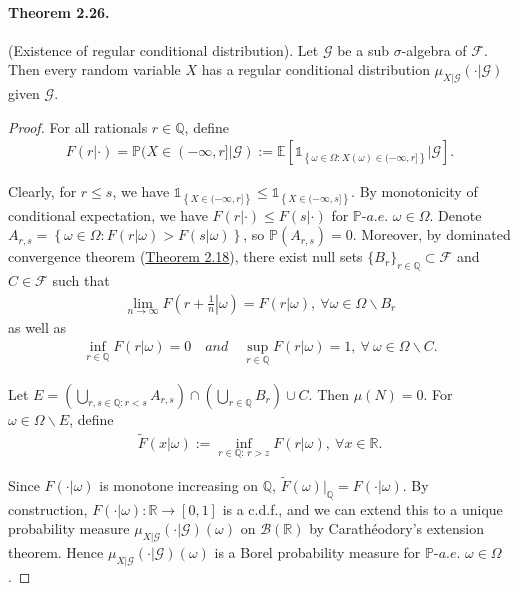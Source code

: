\documentclass{article}
\numberwithin{equation}{section}
\newcommand{\E}{\mathbb{E}}
\renewcommand{\P}{\mathbb{P}}
\theoremstyle{plain}
\theoremstyle{definition}
\begin{document}
\paragraph{Theorem 2.26.\label{thm:2.26}} (Existence of regular conditional distribution). Let $\mathscr{G}$ be a sub $\sigma$-algebra of $\mathscr{F}$. Then every random variable $X$ has a regular conditional distribution $\mu_{X|\mathscr{G}}(\cdot|\mathscr{G})$ given $\mathscr{G}$.
\begin{proof}
For all rationals $r\in\mathbb{Q}$, define
\begin{align*}
	F(r|\cdot) = \P(X\in(-\infty,r]|\mathscr{G}):=\E[\mathds{1}_{\left\{\omega\in\Omega:X(\omega)\in(-\infty,r]\right\}}|\mathscr{G}].
\end{align*}

Clearly, for $r\leq s$, we have $\mathds{1}_{\left\{X\in(-\infty,r]\right\}}\leq\mathds{1}_{\left\{X\in(-\infty,s]\right\}}$. By monotonicity of conditional expectation, we have $F(r|\cdot)\leq F(s|\cdot)$ for $\P\textit{-a.e.}$ $\omega\in\Omega$. Denote $A_{r,s}=\left\{\omega\in\Omega:F(r|\omega)> F(s|\omega)\right\}$, so $\P(A_{r,s})=0$. Moreover, by dominated convergence theorem (\hyperref[thm:2.18]{Theorem 2.18}), there exist null sets $\{B_r\}_{r\in\mathbb{Q}}\subset\mathscr{F}$ and $C\in\mathscr{F}$ such that
\begin{align*}
	\lim_{n\to\infty} F\left(\left.r+\frac{1}{n}\right|\omega\right) = F(r|\omega),\ \forall\omega\in\Omega\backslash B_r
\end{align*}
as well as
\begin{align*}
	\inf_{r\in\mathbb{Q}}F(r|\omega) = 0\quad\textit{and}\quad\sup_{r\in\mathbb{Q}}F(r|\omega)=1,\ \forall\ \omega\in\Omega\backslash C.
\end{align*}

Let $E=\left(\bigcup_{r,s\in\mathbb{Q}:r<s}A_{r,s}\right)\cap\left(\bigcup_{r\in\mathbb{Q}}B_r\right)\cup C$. Then $\mu(N)=0$. For $\omega\in\Omega\backslash E$, define
\begin{align*}
	\widetilde{F}(x|\omega):=\inf_{r\in\mathbb{Q}:\,r>z} F(r|\omega),\ \forall x\in\mathbb{R}.
\end{align*}

Since $F(\cdot|\omega)$ is monotone increasing on $\mathbb{Q}$, $\widetilde{F}(\omega)|_\mathbb{Q}=F(\cdot|\omega)$. By construction, $F(\cdot|\omega):\mathbb{R}\to[0,1]$ is a c.d.f., and we can extend this to a unique probability measure $\mu_{X|\mathscr{G}}(\cdot|\mathscr{G})(\omega)$ on $\mathscr{B}(\mathbb{R})$ by Carathéodory's extension theorem. Hence $\mu_{X|\mathscr{G}}(\cdot|\mathscr{G})(\omega)$ is a Borel probability measure for $\P\textit{-a.e.}$ $\omega\in\Omega$.


\end{proof}
\end{document}
